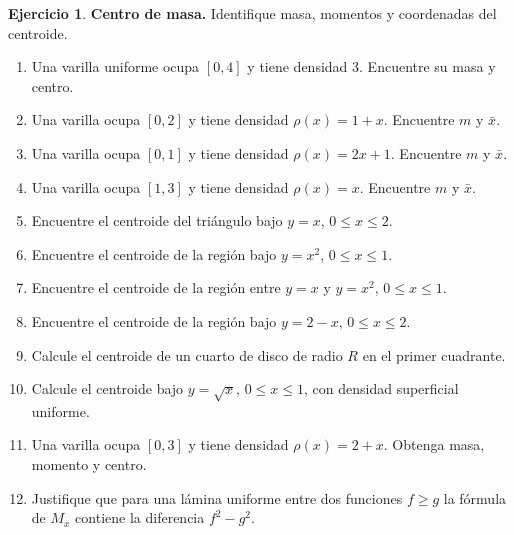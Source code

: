 \documentclass[12pt]{article}
\theoremstyle{definition}
\newtheorem{Ejer}[teorema]{Ejercicio}
\theoremstyle{remark}
\begin{document}
\begin{Ejer}\textbf{Centro de masa.} Identifique masa, momentos y coordenadas del centroide.
\begin{enumerate}[resume=banco3]
\item Una varilla uniforme ocupa $[0,4]$ y tiene densidad $3$. Encuentre su masa y centro.
\item Una varilla ocupa $[0,2]$ y tiene densidad $\rho(x)=1+x$. Encuentre $m$ y $\bar x$.
\item Una varilla ocupa $[0,1]$ y tiene densidad $\rho(x)=2x+1$. Encuentre $m$ y $\bar x$.
\item Una varilla ocupa $[1,3]$ y tiene densidad $\rho(x)=x$. Encuentre $m$ y $\bar x$.
\item Encuentre el centroide del triángulo bajo $y=x$, $0\le x\le2$.
\item Encuentre el centroide de la región bajo $y=x^2$, $0\le x\le1$.
\item Encuentre el centroide de la región entre $y=x$ y $y=x^2$, $0\le x\le1$.
\item Encuentre el centroide de la región bajo $y=2-x$, $0\le x\le2$.
\item Calcule el centroide de un cuarto de disco de radio $R$ en el primer cuadrante.
\item Calcule el centroide bajo $y=\sqrt x$, $0\le x\le1$, con densidad superficial uniforme.
\item Una varilla ocupa $[0,3]$ y tiene densidad $\rho(x)=2+x$. Obtenga masa, momento y centro.
\item Justifique que para una lámina uniforme entre dos funciones $f\ge g$ la fórmula de $M_x$ contiene la diferencia $f^2-g^2$.
\end{enumerate}
\end{Ejer}
\end{document}
